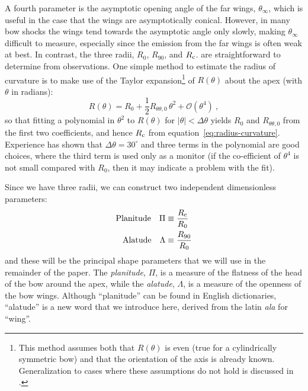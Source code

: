 A fourth parameter is the asymptotic opening angle of the far wings,
\(\theta_\infty\), which is useful in the case that the wings are asymptotically
conical.  However, in many bow shocks the wings tend towards the
asymptotic angle only slowly, making \(\theta_\infty\) difficult to measure,
especially since the emission from the far wings is often weak at
best.  In contrast, the three radii, \(R_0\), \(R_{90}\), and
\(R_{\mathrm{c}}\). are straightforward to determine from observations.  One
simple method to estimate the radius of curvature is to make use of
the Taylor expansion\footnote{%
  This method assumes both that \(R(\theta)\) is even (true for a
  cylindrically symmetric bow) and that the orientation of the axis is
  already known.  Generalization to cases where these assumptions do
  not hold is discussed in \citet{Henney:2018b}.} %
of \(R(\theta)\) about the apex (with \(\theta\) in
radians):
\begin{equation}
  \label{eq:taylor-R-theta}
  R(\theta) = R_0 + \frac12 R_{\theta\theta,0} \,\theta^2 + \mathcal{O}(\theta^4) \ ,
\end{equation}
so that fitting a polynomial in \(\theta^2\) to \(R(\theta)\) for
\(|\theta| < \Delta\theta \) yields \(R_0\) and \(R_{\theta\theta,0}\) from the first two
coefficients, and hence \(R_{\mathrm{c}}\) from
equation~\eqref{eq:radius-curvature}.  Experience has shown that
\(\Delta\theta = 30^\circ\) and three terms in the polynomial are good choices,
where the third term is used only as a monitor (if the co-efficient of
\(\theta^4\) is not small compared with \(R_0\), then it may indicate a
problem with the fit).

Since we have three radii, we can construct two independent
dimensionless parameters:
\begin{align}
  \label{eq:planitude}
  \text{Planitude} \quad \Pi & \equiv  \frac{R_{\mathrm{c}}} {R_0} \\
  \label{eq:alatude}
  \text{Alatude} \quad \Lambda & \equiv  \frac{R_{90}} {R_0}
\end{align}
and these will be the principal shape parameters that we will use in
the remainder of the paper.  The \textit{planitude}, \(\Pi\), is a
measure of the flatness of the head of the bow around the apex, while
the \textit{alatude}, \(\Lambda\), is a measure of the openness of the bow
wings.  Although ``planitude'' can be found in English dictionaries,
``alatude'' is a new word that we introduce here, derived from the
latin \textit{ala} for ``wing''.


